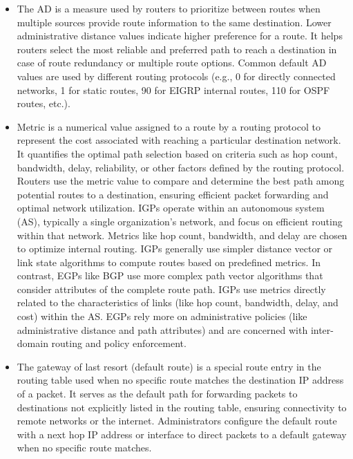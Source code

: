 \documentclass{article}
\begin{document}
\begin{itemize}
	\item[] The AD is a measure used by routers to prioritize between routes when multiple sources provide route information to the same destination. Lower administrative distance values indicate higher preference for a route. It helps routers select the most reliable and preferred path to reach a destination in case of route redundancy or multiple route options. Common default AD values are used by different routing protocols (e.g., 0 for directly connected networks, 1 for static routes, 90 for EIGRP internal routes, 110 for OSPF routes, etc.).
	\item[] Metric is a numerical value assigned to a route by a routing protocol to represent the cost associated with reaching a particular destination network. It quantifies the optimal path selection based on criteria such as hop count, bandwidth, delay, reliability, or other factors defined by the routing protocol. Routers use the metric value to compare and determine the best path among potential routes to a destination, ensuring efficient packet forwarding and optimal network utilization. IGPs operate within an autonomous system (AS), typically a single organization's network, and focus on efficient routing within that network. Metrics like hop count, bandwidth, and delay are chosen to optimize internal routing. IGPs generally use simpler distance vector or link state algorithms to compute routes based on predefined metrics. In contrast, EGPs like BGP use more complex path vector algorithms that consider attributes of the complete route path. IGPs use metrics directly related to the characteristics of links (like hop count, bandwidth, delay, and cost) within the AS. EGPs rely more on administrative policies (like administrative distance and path attributes) and are concerned with inter-domain routing and policy enforcement.
	\item[] The gateway of last resort (default route) is a special route entry in the routing table used when no specific route matches the destination IP address of a packet. It serves as the default path for forwarding packets to destinations not explicitly listed in the routing table, ensuring connectivity to remote networks or the internet. Administrators configure the default route with a next hop IP address or interface to direct packets to a default gateway when no specific route matches.
  

\end{itemize}
\end{document}
